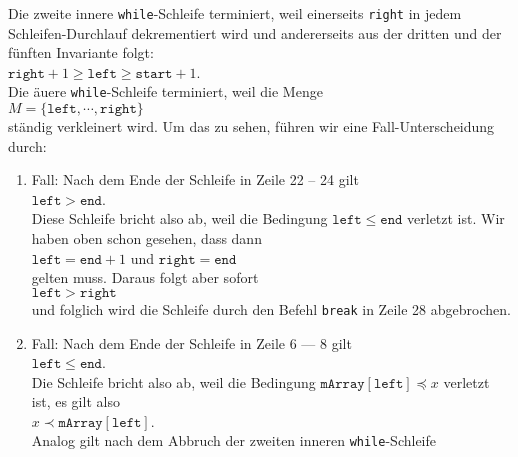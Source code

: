 Die zweite innere
\texttt{while}-Schleife terminiert, weil einerseits \texttt{right} in jedem Schleifen-Durchlauf
dekrementiert wird und andererseits aus der dritten und der f\"unften Invariante folgt: \\[0.1cm]
\hspace*{1.3cm} $\texttt{right} + 1\geq \texttt{left} \geq \mathtt{start} + 1$. \\[0.1cm]
Die \"au\3ere \texttt{while}-Schleife terminiert, weil die Menge \\[0.1cm]
\hspace*{1.3cm} $M = \{ \mathtt{left}, \cdots, \mathtt{right} \}$ \\[0.1cm]
st\"andig verkleinert wird.  Um das zu sehen, f\"uhren wir eine Fall-Unterscheidung durch:
\begin{enumerate}
\item Fall: Nach dem Ende der Schleife in Zeile 22 -- 24 gilt \\[0.1cm]
      \hspace*{1.3cm} $\mathtt{left} > \mathtt{end}$. \\[0.1cm]
      Diese Schleife bricht also ab, weil die Bedingung $\mathtt{left} \leq \mathtt{end}$
      verletzt ist.  Wir haben oben schon gesehen, dass dann \\[0.1cm]
      \hspace*{1.3cm} 
      $\texttt{left} = \mathtt{end} + 1$ \quad und \quad $\mathtt{right} = \mathtt{end}$
      \\[0.1cm]
      gelten muss.  Daraus folgt aber sofort \\[0.1cm]
      \hspace*{1.3cm} $\mathtt{left} > \mathtt{right}$ \\[0.1cm]
      und folglich wird die Schleife durch den Befehl \texttt{break} in Zeile 28 abgebrochen.
\item Fall: Nach dem Ende der Schleife in Zeile 6 --- 8 gilt \\[0.1cm]
      \hspace*{1.3cm} $\mathtt{left} \leq \mathtt{end}$. \\[0.1cm]
      Die Schleife bricht also ab, weil die Bedingung 
      $\mathtt{mArray}[\mathtt{left}] \preceq x$ verletzt ist, es gilt also \\[0.1cm]
      \hspace*{1.3cm} $x \prec \mathtt{mArray}[\mathtt{left}]$. \\[0.1cm]
      Analog gilt nach dem Abbruch der zweiten inneren \texttt{while}-Schleife \\[0.1cm]

\end{enumerate}
